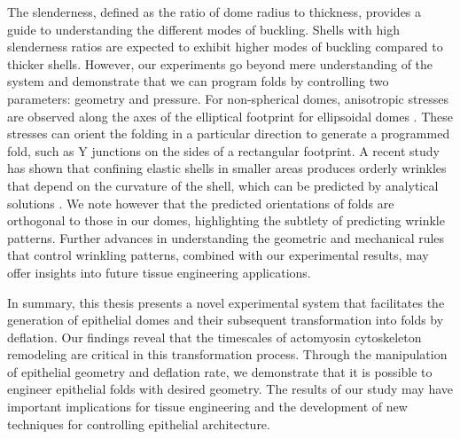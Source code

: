 The slenderness, defined as the ratio of dome radius to thickness, provides a guide to understanding the different modes of buckling. Shells with high slenderness ratios are expected to exhibit higher modes of buckling compared to thicker shells. However, our experiments go beyond mere understanding of the system and demonstrate that we can program folds by controlling two parameters: geometry and pressure. For non-spherical domes, anisotropic stresses are observed along the axes of the elliptical footprint for ellipsoidal domes \cite{marin-llaurado2022}. These stresses can orient the folding in a particular direction to generate a programmed fold, such as Y junctions on the sides of a rectangular footprint. A recent study has shown that confining elastic shells in smaller areas produces orderly wrinkles that depend on the curvature of the shell, which can be predicted by analytical solutions \cite{tobasco2022}. We note however that the predicted orientations of folds are orthogonal to those in our domes, highlighting the subtlety of predicting wrinkle patterns. Further advances in understanding the geometric and mechanical rules that control wrinkling patterns, combined with our experimental results, may offer insights into future tissue engineering applications.

In summary, this thesis presents a novel experimental system that facilitates the generation of epithelial domes and their subsequent transformation into folds by deflation. Our findings reveal that the timescales of actomyosin cytoskeleton remodeling are critical in this transformation process. Through the manipulation of epithelial geometry and deflation rate, we demonstrate that it is possible to engineer epithelial folds with desired geometry. The results of our study may have important implications for tissue engineering and the development of new techniques for controlling epithelial architecture.